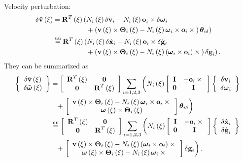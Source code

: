 Velocity perturbation:
\begin{align}
	\delta\tilde{\T{v}}\plbr{\xi}
	&=
	\TT{R}^T\plbr{\xi} \lplbr{
		N_i\plbr{\xi} \delta\T{v}_i
		- N_i\plbr{\xi} \T{o}_i \times \delta\T{\omega}_i
	}
	\nonumber \\
	& \hphantom{= \TT{R}^T\plbr{\xi}(}
	\rplbr{
		\mbox{} + \plbr{
			\T{v}\plbr{\xi} \times \TT{\Theta}_i\plbr{\xi}
			- N_i\plbr{\xi} \T{\omega}_i \times \T{o}_i \times{}
		} \T{\theta}_{i\delta}
	}
	\nonumber \\
	&\equu
	\TT{R}^T\plbr{\xi} \lplbr{
		N_i\plbr{\xi} \delta\dot{\T{x}}_i
		- N_i\plbr{\xi} \T{o}_i \times \delta\dot{\T{g}}_i
	}
	\nonumber \\
	& \hphantom{= \TT{R}^T\plbr{\xi}(}
	\rplbr{
		\mbox{} + \plbr{
			\T{v}\plbr{\xi} \times \TT{\Theta}_i\plbr{\xi}
			- N_i\plbr{\xi} \plbr{\T{\omega}_i \times \T{o}_i} \times{}
		} \delta\T{g}_i
	}
	.
\end{align}
They can be summarized as
\begin{align}
	\cubr{\cvvect{
		\delta\tilde{\T{v}}\plbr{\xi} \\
		\delta\tilde{\T{\omega}}\plbr{\xi}
	}}
	&=
	\sqbr{\matr{cc}{
		\TT{R}^T\plbr{\xi} & \TT{0} \\
		\TT{0} & \TT{R}^T\plbr{\xi}
	}} \sum_{i=1,2,3} \lplbr{
		N_i\plbr{\xi} \sqbr{\matr{cc}{
			\TT{I} & - \T{o}_i \times{} \\
			\TT{0} & \TT{I}
		}} \cubr{\cvvect{
			\delta\T{v}_i \\
			\delta\T{\omega}_i
		}}
	}
	\nonumber \\
	& \hphantom{= } \mbox{}
	+ \rplbr{
		\sqbr{\cvvect{
			\T{v}\plbr{\xi} \times \TT{\Theta}_i\plbr{\xi}
			- N_i\plbr{\xi} \T{\omega}_i \times \T{o}_i \times{} \\
			\T{\omega}\plbr{\xi} \times \TT{\Theta}_i\plbr{\xi}
		}} \T{\theta}_{i\delta}
	}
	\nonumber \\
	&\equu
	\sqbr{\matr{cc}{
		\TT{R}^T\plbr{\xi} & \TT{0} \\
		\TT{0} & \TT{R}^T\plbr{\xi}
	}} \sum_{i=1,2,3} \lplbr{
		N_i\plbr{\xi} \sqbr{\matr{cc}{
			\TT{I} & - \T{o}_i \times{} \\
			\TT{0} & \TT{I}
		}} \cubr{\cvvect{
			\delta\dot{\T{x}}_i \\
			\delta\dot{\T{g}}_i
		}}
	}
	\nonumber \\
	& \hphantom{= } \mbox{}
	+ \rplbr{
		\sqbr{\cvvect{
			\T{v}\plbr{\xi} \times \TT{\Theta}_i\plbr{\xi}
			- N_i\plbr{\xi} \plbr{\T{\omega}_i \times \T{o}_i} \times{} \\
			\T{\omega}\plbr{\xi} \times \TT{\Theta}_i\plbr{\xi}
			- N_i\plbr{\xi} \T{\omega}_i \times{}
		}} \delta\T{g}_i
	}
	.
\end{align}

